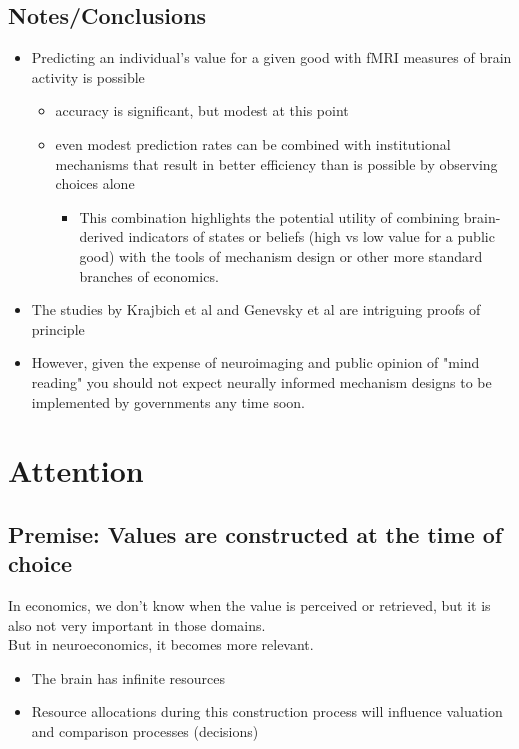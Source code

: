 \subsection{Notes/Conclusions}
\begin{itemize}
    \item Predicting an individual's value for a given good with fMRI measures of brain activity is possible
    \begin{itemize}
        \item accuracy is significant, but modest at this point
        \item even modest prediction rates can be combined with institutional mechanisms that result in better efficiency than is possible by observing choices alone
        \begin{itemize}
            \item This combination highlights the potential utility of combining brain-derived indicators of states or beliefs (high vs low value for a public good) with the tools of mechanism design or other more standard branches of economics.
        \end{itemize}
    \end{itemize}
    \item The studies by Krajbich et al and Genevsky et al are intriguing proofs of principle
    \item However, given the expense of neuroimaging and public opinion of "mind reading" you should not expect neurally informed mechanism designs to be implemented by governments any time soon.
\end{itemize}
\section{Attention}
\subsection{Premise: Values are constructed at the time of choice}
In economics, we don't know when the value is perceived or retrieved, but it is also not very important in those domains.
\\But in neuroeconomics, it becomes more relevant.
\begin{itemize}
    \item The brain has infinite resources
    \item Resource allocations during this construction process will influence valuation and comparison processes (decisions)
\end{itemize}

